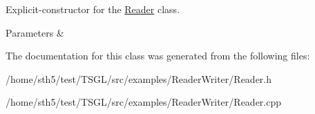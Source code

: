 Explicit-\/constructor for the \hyperlink{class_reader}{Reader} class. 


\begin{DoxyParams}{Parameters}
{\em } & \\
\hline
\end{DoxyParams}


The documentation for this class was generated from the following files\+:\begin{DoxyCompactItemize}
\item 
/home/sth5/test/\+T\+S\+G\+L/src/examples/\+Reader\+Writer/Reader.\+h\item 
/home/sth5/test/\+T\+S\+G\+L/src/examples/\+Reader\+Writer/Reader.\+cpp\end{DoxyCompactItemize}
